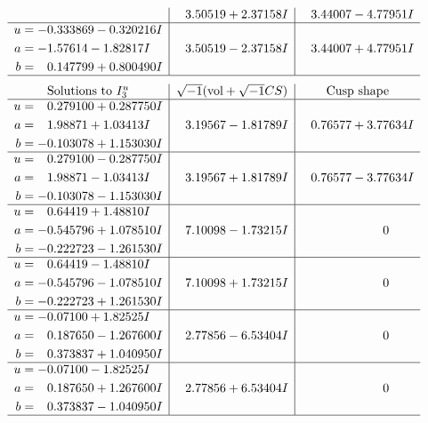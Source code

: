 \documentclass[1p]{elsarticle_modified}
\theoremstyle{definition}
\newcommand{\I}{\sqrt{-1}}
\begin{document}
$$\begin{array}{c|c|c}
 & \phantom{-}3.50519 + 2.37158 I & \phantom{-}3.44007 - 4.77951 I \\ \hline\begin{aligned}
u &= -0.333869 - 0.320216 I \\
a &= -1.57614 - 1.82817 I \\
b &= \phantom{-}0.147799 + 0.800490 I\end{aligned}
 & \phantom{-}3.50519 - 2.37158 I & \phantom{-}3.44007 + 4.77951 I\\
 \hline 
 \end{array}$$\newpage$$\begin{array}{c|c|c}  
\text{Solutions to }I^u_{3}& \I (\text{vol} + \sqrt{-1}CS) & \text{Cusp shape}\\
 \hline 
\begin{aligned}
u &= \phantom{-}0.279100 + 0.287750 I \\
a &= \phantom{-}1.98871 + 1.03413 I \\
b &= -0.103078 + 1.153030 I\end{aligned}
 & \phantom{-}3.19567 - 1.81789 I & \phantom{-}0.76577 + 3.77634 I \\ \hline\begin{aligned}
u &= \phantom{-}0.279100 - 0.287750 I \\
a &= \phantom{-}1.98871 - 1.03413 I \\
b &= -0.103078 - 1.153030 I\end{aligned}
 & \phantom{-}3.19567 + 1.81789 I & \phantom{-}0.76577 - 3.77634 I \\ \hline\begin{aligned}
u &= \phantom{-}0.64419 + 1.48810 I \\
a &= -0.545796 + 1.078510 I \\
b &= -0.222723 - 1.261530 I\end{aligned}
 & \phantom{-}7.10098 - 1.73215 I & \phantom{-0.000000 } 0 \\ \hline\begin{aligned}
u &= \phantom{-}0.64419 - 1.48810 I \\
a &= -0.545796 - 1.078510 I \\
b &= -0.222723 + 1.261530 I\end{aligned}
 & \phantom{-}7.10098 + 1.73215 I & \phantom{-0.000000 } 0 \\ \hline\begin{aligned}
u &= -0.07100 + 1.82525 I \\
a &= \phantom{-}0.187650 - 1.267600 I \\
b &= \phantom{-}0.373837 + 1.040950 I\end{aligned}
 & \phantom{-}2.77856 - 6.53404 I & \phantom{-0.000000 } 0 \\ \hline\begin{aligned}
u &= -0.07100 - 1.82525 I \\
a &= \phantom{-}0.187650 + 1.267600 I \\
b &= \phantom{-}0.373837 - 1.040950 I\end{aligned}
 & \phantom{-}2.77856 + 6.53404 I & \phantom{-0.000000 } 0\\
 \hline 
 \end{array}$$\newpage
\end{document}
